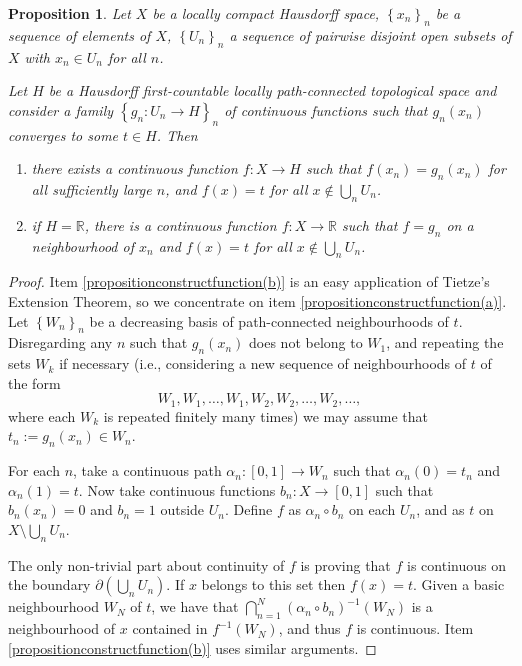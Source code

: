 \documentclass[letter,11pt]{amsart}
\theoremstyle{plain}		\newtheorem{theorem}[generalnumbering]{Theorem}
\theoremstyle{plain}		\newtheorem{corollary}[generalnumbering]{Corollary}
\theoremstyle{definition}		\newtheorem{definition}[generalnumbering]{Definition}
\theoremstyle{definition}		\newtheorem{example}[generalnumbering]{Example}
\theoremstyle{plain}		\newtheorem{proposition}[generalnumbering]{Proposition}
\theoremstyle{plain}		\newtheorem{lemma}[generalnumbering]{Lemma}
\theoremstyle{definition}
\begin{document}
\begin{proposition}\label{propositionconstructfunction}
	Let $X$ be a locally compact Hausdorff space, $\left\{x_n\right\}_n$ be a sequence of elements of $X$, $\left\{U_n\right\}_n$ a sequence of pairwise disjoint open subsets of $X$ with $x_n\in U_n$ for all $n$.
	
	Let $H$ be a Hausdorff first-countable locally path-connected topological space and consider a family $\left\{g_n\colon U_n\to H\right\}_n$ of continuous functions such that $g_n(x_n)$ converges to some $t\in H$. Then
	\begin{enumerate}[label=(\alph*)]
		\item\label{propositionconstructfunction(a)} there exists a continuous function $f\colon X\to H$ such that $f(x_n)=g_n(x_n)$ for all sufficiently large $n$, and $f(x)=t$ for all $x\not\in\bigcup_n U_n$.
		\item\label{propositionconstructfunction(b)} if $H=\mathbb{R}$, there is a continuous function $f\colon X\to\mathbb{R}$ such that $f=g_n$ on a neighbourhood of $x_n$ and $f(x)=t$ for all $x\not\in\bigcup_n U_n$.
	\end{enumerate}
\end{proposition}
\begin{proof} Item \ref{propositionconstructfunction(b)} is an easy application of Tietze's Extension Theorem, so we concentrate on item \ref{propositionconstructfunction(a)}. Let $\left\{W_n\right\}_n$ be a decreasing basis of path-connected neighbourhoods of $t$. Disregarding any $n$ such that $g_n(x_n)$ does not belong to $W_1$, and repeating the sets $W_k$ if necessary (i.e., considering a new sequence of neighbourhoods of $t$ of the form
	\[W_1,W_1,\ldots,W_1,W_2,W_2,\ldots,W_2,\ldots,\]
	where each $W_k$ is repeated finitely many times) we may assume that $t_n:=g_n(x_n)\in W_n$.
	
	For each $n$, take a continuous path $\alpha_n\colon [0,1]\to W_n$ such that $\alpha_n(0)=t_n$ and $\alpha_n(1)=t$. Now take continuous functions $b_n\colon X\to[0,1]$ such that $b_n(x_n)=0$ and $b_n=1$ outside $U_n$. Define $f$ as $\alpha_n\circ b_n$ on each $U_n$, and as $t$ on $X\setminus\bigcup_n U_n$.
	
	The only non-trivial part about continuity of $f$ is proving that $f$ is continuous on the boundary $\partial\left(\bigcup_n U_n\right)$. If $x$ belongs to this set then $f(x)=t$. Given a basic neighbourhood $W_N$ of $t$, we have that $\bigcap_{n=1}^N(\alpha_n\circ b_n)^{-1}(W_N)$ is a neighbourhood of $x$ contained in $f^{-1}(W_N)$, and thus $f$ is continuous. Item \ref{propositionconstructfunction(b)} uses similar arguments.
\end{proof}
\end{document}
